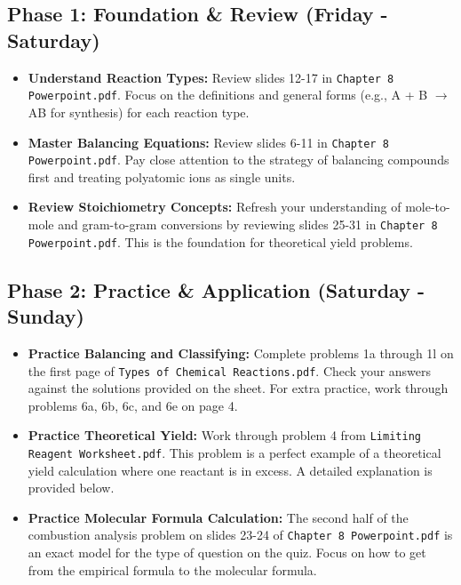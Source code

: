 \documentclass{article}
\begin{document}
\subsection*{Phase 1: Foundation \& Review (Friday - Saturday)}
\begin{itemize}[itemsep=5pt]
    \item \textbf{Understand Reaction Types:} Review slides 12-17 in \texttt{Chapter 8 Powerpoint.pdf}. Focus on the definitions and general forms (e.g., A + B $\rightarrow$ AB for synthesis) for each reaction type.
    \item \textbf{Master Balancing Equations:} Review slides 6-11 in \texttt{Chapter 8 Powerpoint.pdf}. Pay close attention to the strategy of balancing compounds first and treating polyatomic ions as single units.
    \item \textbf{Review Stoichiometry Concepts:} Refresh your understanding of mole-to-mole and gram-to-gram conversions by reviewing slides 25-31 in \texttt{Chapter 8 Powerpoint.pdf}. This is the foundation for theoretical yield problems.
\end{itemize}

\bigskip

\subsection*{Phase 2: Practice \& Application (Saturday - Sunday)}
\begin{itemize}[itemsep=5pt]
    \item \textbf{Practice Balancing and Classifying:} Complete problems 1a through 1l on the first page of \texttt{Types of Chemical Reactions.pdf}. Check your answers against the solutions provided on the sheet. For extra practice, work through problems 6a, 6b, 6c, and 6e on page 4.
    \item \textbf{Practice Theoretical Yield:} Work through problem 4 from \texttt{Limiting Reagent Worksheet.pdf}. This problem is a perfect example of a theoretical yield calculation where one reactant is in excess. A detailed explanation is provided below.
    \item \textbf{Practice Molecular Formula Calculation:} The second half of the combustion analysis problem on slides 23-24 of \texttt{Chapter 8 Powerpoint.pdf} is an exact model for the type of question on the quiz. Focus on how to get from the empirical formula to the molecular formula.
\end{itemize}

\bigskip
\end{document}
